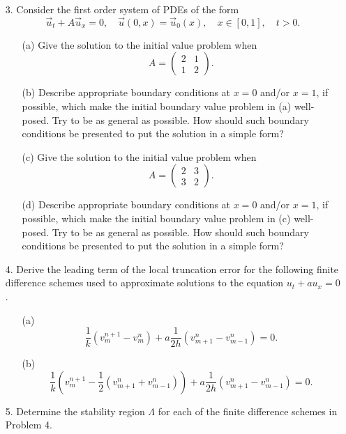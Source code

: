 \documentclass{article}
\begin{document}
\begin{itemize}
\item[3.] Consider the first order system of PDEs of the form
\begin{equation*}
\vec{u}_t + A \vec{u}_x = 0, \quad \vec{u}(0,x) = \vec{u}_0(x), \quad x \in [0,1], \quad t > 0.
\end{equation*}
\begin{itemize}
\item[(a)] Give the solution to the initial value problem when
\begin{equation*}
A = \begin{pmatrix} 2 & 1 \\ 1 & 2 \end{pmatrix}.
\end{equation*}
\item[(b)] Describe appropriate boundary conditions at $x = 0$ and/or $x = 1$, if possible, which make the initial boundary value problem in (a) well-posed. Try to be as general as possible. How should such boundary conditions be presented to put the solution in a simple form?
\item[(c)] Give the solution to the initial value problem when
\begin{equation*}
A = \begin{pmatrix} 2 & 3 \\ 3 & 2 \end{pmatrix}.
\end{equation*}
\item[(d)] Describe appropriate boundary conditions at $x = 0$ and/or $x = 1$, if possible, which make the initial boundary value problem in (c) well-posed. Try to be as general as possible. How should such boundary conditions be presented to put the solution in a simple form?
\end{itemize}

\item[4.] Derive the leading term of the local truncation error for the following finite difference schemes used to approximate solutions to the equation $u_t + a u_x = 0$.
\begin{itemize}
\item[(a)]
\begin{equation*}
\frac{1}{k} \left( v^{n+1}_m - v^n_m \right) + a \frac{1}{2h} \left( v^n_{m+1} - v^n_{m-1} \right) = 0.
\end{equation*}
\item [(b)]
\begin{equation*}
\frac{1}{k} \left( v^{n+1}_m - \frac{1}{2} \left( v^n_{m+1} + v^n_{m-1} \right) \right) + a \frac{1}{2h} \left( v^n_{m+1} - v^n_{m-1} \right) = 0.
\end{equation*}
\end{itemize}

\item[5.] Determine the stability region $\Lambda$ for each of the finite difference schemes in Problem 4.

\end{itemize}
\end{document}
